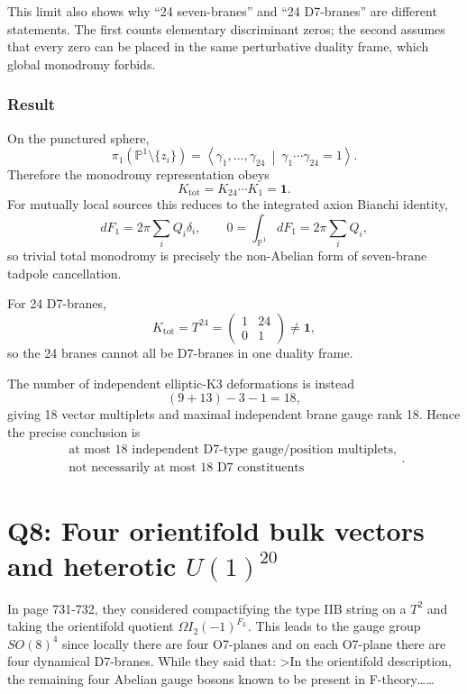 \documentclass[
  10pt,
  a4paper,
  openany]{book}
\begin{document}
This limit also shows why ``24 seven-branes'' and ``24 D7-branes'' are
different statements. The first counts elementary discriminant zeros;
the second assumes that every zero can be placed in the same
perturbative duality frame, which global monodromy forbids.

\subsubsection{Result}\label{result-42}

On the punctured sphere, \[
\pi_1\!\left(
\mathbb P^1\setminus\{z_i\}
\right)
=
\left\langle
\gamma_1,\ldots,\gamma_{24}
\ \middle|\
\gamma_1\cdots\gamma_{24}=1
\right\rangle.
\] Therefore the monodromy representation obeys \[
\boxed{
K_{\mathrm{tot}}
=K_{24}\cdots K_1
=\mathbf1
}.
\] For mutually local sources this reduces to the integrated axion
Bianchi identity, \[
dF_1=2\pi\sum_iQ_i\delta_i,
\qquad
0=\int_{\mathbb P^1}dF_1
=2\pi\sum_iQ_i,
\] so trivial total monodromy is precisely the non-Abelian form of
seven-brane tadpole cancellation.

For 24 D7-branes, \[
K_{\mathrm{tot}}
=T^{24}
=
\begin{pmatrix}
1&24\\
0&1
\end{pmatrix}
\neq\mathbf1,
\] so the 24 branes cannot all be D7-branes in one duality frame.

The number of independent elliptic-K3 deformations is instead \[
\boxed{
(9+13)-3-1=18
},
\] giving 18 vector multiplets and maximal independent brane gauge rank
18. Hence the precise conclusion is \[
\boxed{\begin{gathered}
\text{at most 18 independent D7-type gauge/position multiplets,}\\
\text{not necessarily at most 18 D7 constituents}
\end{gathered}}.
\]

\section{\texorpdfstring{Q8: Four orientifold bulk vectors and heterotic
\(U(1)^{20}\)}{Q8: Four orientifold bulk vectors and heterotic U(1)\^{}\{20\}}}\label{q8-four-orientifold-bulk-vectors-and-heterotic-u120}

In page 731-732, they considered compactifying the type IIB string on a
\(T^2\) and taking the orientifold quotient
\(\Omega I_{2}(-1)^{F_{L}}\). This leads to the gauge group \(SO(8)^4\)
since locally there are four O7-planes and on each O7-plane there are
four dynamical D7-branes. While they said that: \textgreater In the
orientifold description, the remaining four Abelian gauge bosons known
to be present in F-theory\ldots\ldots{}
\end{document}
